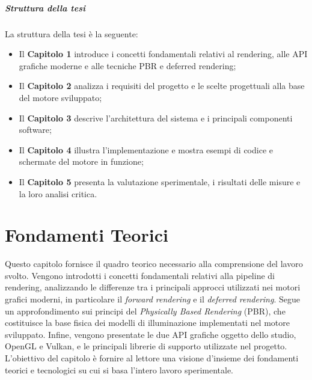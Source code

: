 \documentclass[12pt,a4paper,openright,twoside]{book}
\begin{document}
\paragraph{Struttura della tesi}
La struttura della tesi è la seguente:
\begin{itemize}
   \item Il \textbf{Capitolo 1} introduce i concetti fondamentali relativi al rendering, alle API grafiche moderne e alle tecniche PBR e deferred rendering;
   \item Il \textbf{Capitolo 2} analizza i requisiti del progetto e le scelte progettuali alla base del motore sviluppato;
   \item Il \textbf{Capitolo 3} descrive l'architettura del sistema e i principali componenti software;
   \item Il \textbf{Capitolo 4} illustra l'implementazione e mostra esempi di codice e schermate del motore in funzione;
   \item Il \textbf{Capitolo 5} presenta la valutazione sperimentale, i risultati delle misure e la loro analisi critica.
\end{itemize}

\chapter{Fondamenti Teorici}
\label{chap:fondamenti-teorici}
\noindent
Questo capitolo fornisce il quadro teorico necessario alla comprensione del lavoro svolto.
Vengono introdotti i concetti fondamentali relativi alla pipeline di rendering,
analizzando le differenze tra i principali approcci utilizzati nei motori grafici moderni,
in particolare il \emph{forward rendering} e il \emph{deferred rendering}.
Segue un approfondimento sui principi del \emph{Physically Based Rendering} (PBR),
che costituisce la base fisica dei modelli di illuminazione implementati nel motore sviluppato.
Infine, vengono presentate le due API grafiche oggetto dello studio, OpenGL e Vulkan,
e le principali librerie di supporto utilizzate nel progetto.
L'obiettivo del capitolo è fornire al lettore una visione d'insieme dei fondamenti teorici e tecnologici
su cui si basa l'intero lavoro sperimentale.
\end{document}
